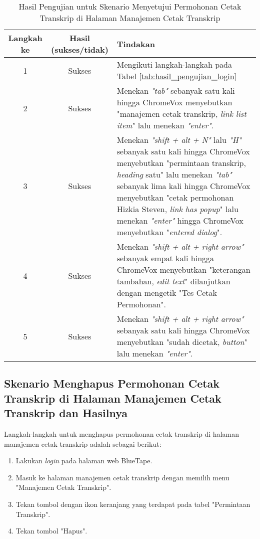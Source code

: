 \begin{table}[H]
    \centering 
    \caption{Hasil Pengujian untuk Skenario Menyetujui Permohonan Cetak Transkrip di Halaman Manajemen Cetak Transkrip}
    \label{tab:hasil_pengujian_menyetujui_permohonan_cetak_transkrip_di_halaman_manajemen_cetak_transkrip}
    \begin{tabular}{|c|c|p{10cm}|}
        \toprule
        Langkah ke & Hasil (sukses/tidak) & Tindakan \\

        \midrule
        1 & Sukses & Mengikuti langkah-langkah pada Tabel \ref{tab:hasil_pengujian_login} \\
        2 & Sukses & Menekan \textit{"tab"} sebanyak satu kali hingga ChromeVox menyebutkan "manajemen cetak transkrip, \textit{link list item}" lalu menekan \textit{"enter"}. \\
        3 & Sukses & Menekan \textit{"shift + alt + N"} lalu \textit{"H"} sebanyak satu kali hingga ChromeVox menyebutkan "permintaan transkrip, \textit{heading} satu" lalu menekan \textit{"tab"} sebanyak lima kali hingga ChromeVox menyebutkan "cetak permohonan Hizkia Steven, \textit{link has popup}" lalu menekan \textit{"enter"} hingga ChromeVox menyebutkan "\textit{entered dialog}". \\
        4 & Sukses & Menekan \textit{"shift + alt + right arrow"} sebanyak empat kali hingga ChromeVox menyebutkan "keterangan tambahan, \textit{edit text}" dilanjutkan dengan mengetik "Tes Cetak Permohonan". \\
        5 & Sukses & Menekan \textit{"shift + alt + right arrow"} sebanyak satu kali hingga ChromeVox menyebutkan "sudah dicetak, \textit{button}" lalu menekan \textit{"enter"}. \\ 

        \bottomrule

    \end{tabular}
\end{table}

\subsection{Skenario Menghapus Permohonan Cetak Transkrip di Halaman Manajemen Cetak Transkrip dan Hasilnya}
\label{subsec:skenario_menghapus_permohonan_cetak_transkrip_di_halaman_manajemen_cetak_transkrip}
Langkah-langkah untuk menghapus permohonan cetak transkrip di halaman manajemen cetak transkrip adalah sebagai berikut:

\begin{enumerate}
    \item Lakukan \textit{login} pada halaman web BlueTape.
    \item Masuk ke halaman manajemen cetak transkrip dengan memilih menu "Manajemen Cetak Transkrip".
    \item Tekan tombol dengan ikon keranjang yang terdapat pada tabel "Permintaan Transkrip".
    \item Tekan tombol "Hapus".
\end{enumerate}

